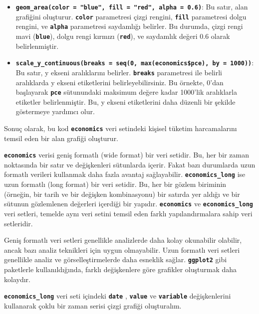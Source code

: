\documentclass[
  letterpaper,
  DIV=11,
  numbers=noendperiod]{scrreprt}
\begin{document}
\begin{itemize}
\item
  \textbf{\texttt{geom\_area(color\ =\ "blue",\ fill\ =\ "red",\ alpha\ =\ 0.6)}}:
  Bu satır, alan grafiğini oluşturur. \textbf{\texttt{color}}
  parametresi çizgi rengini, \textbf{\texttt{fill}} parametresi dolgu
  rengini, ve \textbf{\texttt{alpha}} parametresi saydamlığı belirler.
  Bu durumda, çizgi rengi mavi (\textbf{\texttt{blue}}), dolgu rengi
  kırmızı (\textbf{\texttt{red}}), ve saydamlık değeri 0.6 olarak
  belirlenmiştir.
\item
  \textbf{\texttt{scale\_y\_continuous(breaks\ =\ seq(0,\ max(economics\$pce),\ by\ =\ 1000))}}:
  Bu satır, y ekseni aralıklarını belirler. \textbf{\texttt{breaks}}
  parametresi ile belirli aralıklarda y ekseni etiketlerini
  belirleyebilirsiniz. Bu örnekte, 0'dan başlayarak
  \textbf{\texttt{pce}} sütunundaki maksimum değere kadar 1000'lik
  aralıklarla etiketler belirlenmiştir. Bu, y ekseni etiketlerini daha
  düzenli bir şekilde göstermeye yardımcı olur.
\end{itemize}

Sonuç olarak, bu kod \textbf{\texttt{economics}} veri setindeki kişisel
tüketim harcamalarını temsil eden bir alan grafiği oluşturur.

\textbf{\texttt{economics}} verisi geniş formatlı (wide format) bir veri
setidir. Bu, her bir zaman noktasında bir satır ve değişkenleri
sütunlarda içerir. Fakat bazı durumlarda uzun formatlı verileri
kullanmak daha fazla avantaj sağlayabilir.
\textbf{\texttt{economics\_long}} ise uzun formatlı (long format) bir
veri setidir. Bu, her bir gözlem biriminin (örneğin, bir tarih ve bir
değişken kombinasyonu) bir satırda yer aldığı ve bir sütunun gözlemlenen
değerleri içerdiği bir yapıdır. \textbf{\texttt{economics}} ve
\textbf{\texttt{economics\_long}} veri setleri, temelde aynı veri setini
temsil eden farklı yapılandırmalara sahip veri setleridir.

Geniş formatlı veri setleri genellikle analizlerde daha kolay okunabilir
olabilir, ancak bazı analiz teknikleri için uygun olmayabilir. Uzun
formatlı veri setleri genellikle analiz ve görselleştirmelerde daha
esneklik sağlar. \textbf{\texttt{ggplot2}} gibi paketlerle
kullanıldığında, farklı değişkenlere göre grafikler oluşturmak daha
kolaydır.

\textbf{\texttt{economics\_long}} veri seti içindeki
\textbf{\texttt{date}} , \textbf{\texttt{value}} ve
\textbf{\texttt{variable}} değişkenlerini kullanarak çoklu bir zaman
serisi çizgi grafiği oluşturalım.
\end{document}
